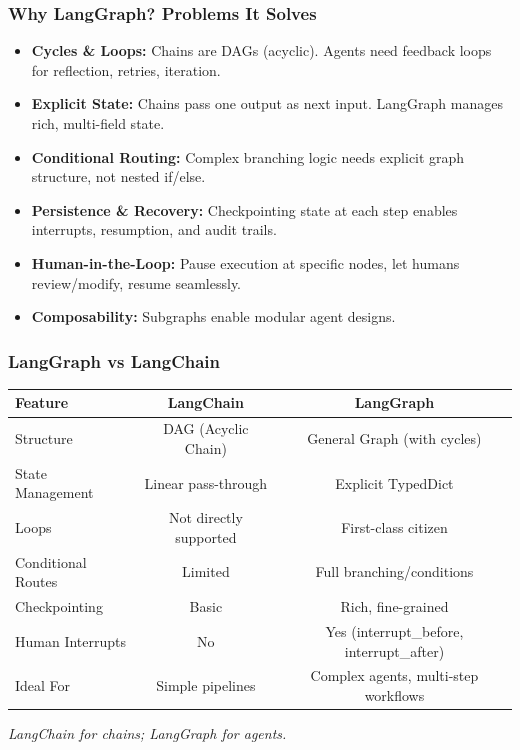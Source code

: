 \documentclass[aspectratio=169,11pt]{beamer}
\begin{document}
\begin{frame}
\frametitle{Why LangGraph? Problems It Solves}
\begin{itemize}
    \setlength{\itemsep}{1pt}
  \item \textbf{Cycles \& Loops:} Chains are DAGs (acyclic). Agents need feedback loops for reflection, retries, iteration.
  \item \textbf{Explicit State:} Chains pass one output as next input. LangGraph manages rich, multi-field state.
  \item \textbf{Conditional Routing:} Complex branching logic needs explicit graph structure, not nested if/else.
  \item \textbf{Persistence \& Recovery:} Checkpointing state at each step enables interrupts, resumption, and audit trails.
  \item \textbf{Human-in-the-Loop:} Pause execution at specific nodes, let humans review/modify, resume seamlessly.
  \item \textbf{Composability:} Subgraphs enable modular agent designs.
\end{itemize}
\end{frame}

\begin{frame}
\frametitle{LangGraph vs LangChain}
\vspace{10pt}
\small
\begin{tabular}{l|c|c}
\toprule
\textbf{Feature} & \textbf{LangChain} & \textbf{LangGraph} \\
\midrule
Structure & DAG (Acyclic Chain) & General Graph (with cycles) \\
State Management & Linear pass-through & Explicit TypedDict \\
Loops & Not directly supported & First-class citizen \\
Conditional Routes & Limited & Full branching/conditions \\
Checkpointing & Basic & Rich, fine-grained \\
Human Interrupts & No & Yes (interrupt\_before, interrupt\_after) \\
Ideal For & Simple pipelines & Complex agents, multi-step workflows \\
\bottomrule
\end{tabular}

\vspace{15pt}
\textit{LangChain for chains; LangGraph for agents.}
\end{frame}
\end{document}
